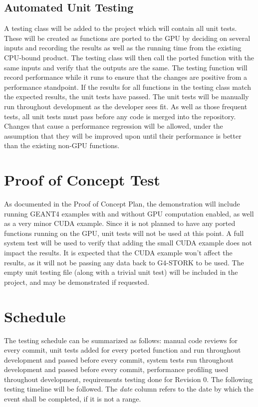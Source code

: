 \documentclass[12pt]{article}
\begin{document}
\subsection{Automated Unit Testing}
A testing class will be added to the project which will contain all unit tests. These will be created as functions are ported to the GPU by deciding on several inputs and recording the results as well as the running time from the existing CPU-bound product. The testing class will then call the ported function with the same inputs and verify that the outputs are the same. The testing function will record performance while it runs to ensure that the changes are positive from a performance standpoint. If the results for all functions in the testing class match the expected results, the unit tests have passed. The unit tests will be manually run throughout development as the developer sees fit. As well as those frequent tests, all unit tests must pass before any code is merged into the repository. Changes that cause a performance regression will be allowed, under the assumption that they will be improved upon until their performance is better than the existing non-GPU functions.

\section{Proof of Concept Test}
As documented in the Proof of Concept Plan, the demonstration will include running GEANT4 examples with and without GPU computation enabled, as well as a very minor CUDA example. Since it is not planned to have any ported functions running on the GPU, unit tests will not be used at this point. A full system test will be used to verify that adding the small CUDA example does not impact the results. It is expected that the CUDA example won't affect the results, as it will not be passing any data back to G4-STORK to be used. The empty unit testing file (along with a trivial unit test) will be included in the project, and may be demonstrated if requested.

\section{Schedule}
The testing schedule can be summarized as follows: manual code reviews for every commit, unit tests added for every ported function and run throughout development and passed before every commit, system tests run throughout development and passed before every commit, performance profiling used throughout development, requirements testing done for Revision 0. The following testing timeline will be followed. The \emph{date} column refers to the date by which the event shall be completed, if it is not a range.
\end{document}
